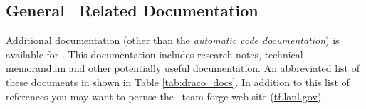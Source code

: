 


\subsection{General \draco\ Related Documentation}

Additional documentation (other than the \emph{automatic code
documentation}) is available for \draco.  This documentation includes
research notes, technical memorandum and other potentially useful
documentation.  An abbreviated list of these documents in shown in
Table \ref{tab:draco_docs}.  In addition to this list of references
you may want to peruse the \draco\ team forge web site
(\url{tf.lanl.gov}). 


